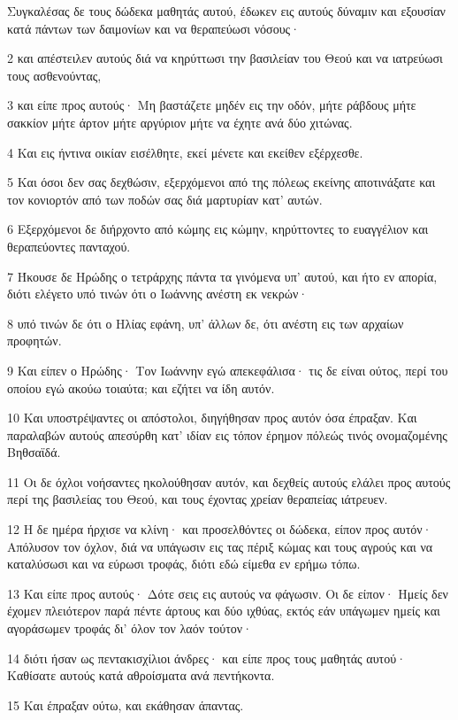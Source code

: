 \par Συγκαλέσας δε τους δώδεκα μαθητάς αυτού, έδωκεν εις αυτούς δύναμιν και εξουσίαν κατά πάντων των δαιμονίων και να θεραπεύωσι νόσους·
\par 2 και απέστειλεν αυτούς διά να κηρύττωσι την βασιλείαν του Θεού και να ιατρεύωσι τους ασθενούντας,
\par 3 και είπε προς αυτούς· Μη βαστάζετε μηδέν εις την οδόν, μήτε ράβδους μήτε σακκίον μήτε άρτον μήτε αργύριον μήτε να έχητε ανά δύο χιτώνας.
\par 4 Και εις ήντινα οικίαν εισέλθητε, εκεί μένετε και εκείθεν εξέρχεσθε.
\par 5 Και όσοι δεν σας δεχθώσιν, εξερχόμενοι από της πόλεως εκείνης αποτινάξατε και τον κονιορτόν από των ποδών σας διά μαρτυρίαν κατ' αυτών.
\par 6 Εξερχόμενοι δε διήρχοντο από κώμης εις κώμην, κηρύττοντες το ευαγγέλιον και θεραπεύοντες πανταχού.
\par 7 Ήκουσε δε Ηρώδης ο τετράρχης πάντα τα γινόμενα υπ' αυτού, και ήτο εν απορία, διότι ελέγετο υπό τινών ότι ο Ιωάννης ανέστη εκ νεκρών·
\par 8 υπό τινών δε ότι ο Ηλίας εφάνη, υπ' άλλων δε, ότι ανέστη εις των αρχαίων προφητών.
\par 9 Και είπεν ο Ηρώδης· Τον Ιωάννην εγώ απεκεφάλισα· τις δε είναι ούτος, περί του οποίου εγώ ακούω τοιαύτα; και εζήτει να ίδη αυτόν.
\par 10 Και υποστρέψαντες οι απόστολοι, διηγήθησαν προς αυτόν όσα έπραξαν. Και παραλαβών αυτούς απεσύρθη κατ' ιδίαν εις τόπον έρημον πόλεώς τινός ονομαζομένης Βηθσαϊδά.
\par 11 Οι δε όχλοι νοήσαντες ηκολούθησαν αυτόν, και δεχθείς αυτούς ελάλει προς αυτούς περί της βασιλείας του Θεού, και τους έχοντας χρείαν θεραπείας ιάτρευεν.
\par 12 Η δε ημέρα ήρχισε να κλίνη· και προσελθόντες οι δώδεκα, είπον προς αυτόν· Απόλυσον τον όχλον, διά να υπάγωσιν εις τας πέριξ κώμας και τους αγρούς και να καταλύσωσι και να εύρωσι τροφάς, διότι εδώ είμεθα εν ερήμω τόπω.
\par 13 Και είπε προς αυτούς· Δότε σεις εις αυτούς να φάγωσιν. Οι δε είπον· Ημείς δεν έχομεν πλειότερον παρά πέντε άρτους και δύο ιχθύας, εκτός εάν υπάγωμεν ημείς και αγοράσωμεν τροφάς δι' όλον τον λαόν τούτον·
\par 14 διότι ήσαν ως πεντακισχίλιοι άνδρες· και είπε προς τους μαθητάς αυτού· Καθίσατε αυτούς κατά αθροίσματα ανά πεντήκοντα.
\par 15 Και έπραξαν ούτω, και εκάθησαν άπαντας.
